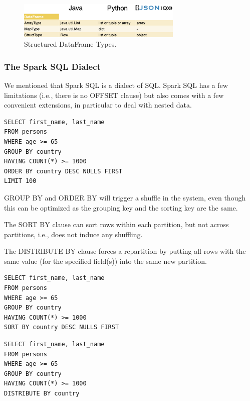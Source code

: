 \begin{figure}[h]
    \centering
    \includegraphics[width=0.7\textwidth]{Figures/DataFrameTypes2.png}
    \caption{Structured DataFrame Types.}\label{fig:StructuredTypes}
\end{figure}

\subsubsection{The Spark SQL Dialect}

We mentioned that Spark SQL is a dialect of SQL. Spark SQL has a few limitations (i.e., there is no OFFSET clause) but also comes with a few convenient extensions, in particular to deal with nested data.

\begin{lstlisting}[style=sql]
SELECT first_name, last_name
FROM persons
WHERE age >= 65
GROUP BY country
HAVING COUNT(*) >= 1000
ORDER BY country DESC NULLS FIRST
LIMIT 100
\end{lstlisting}

GROUP BY and ORDER BY will trigger a shuffle in the system, even though this can be optimized as the grouping key and the sorting key are the same.

The SORT BY clause can sort rows within each partition, but not across partitions, i.e., does not induce any shuffling.

The DISTRIBUTE BY clause forces a repartition by putting all rows with the same value (for the specified field(s)) into the same new partition.

\begin{minipage}{0.45\textwidth}
\begin{lstlisting}[style=sql]
SELECT first_name, last_name
FROM persons
WHERE age >= 65
GROUP BY country
HAVING COUNT(*) >= 1000
SORT BY country DESC NULLS FIRST
\end{lstlisting}
\end{minipage}
\hfill
\begin{minipage}{0.45\textwidth}
\begin{lstlisting}[style=sql]
SELECT first_name, last_name
FROM persons
WHERE age >= 65
GROUP BY country
HAVING COUNT(*) >= 1000
DISTRIBUTE BY country
\end{lstlisting}
\end{minipage}

